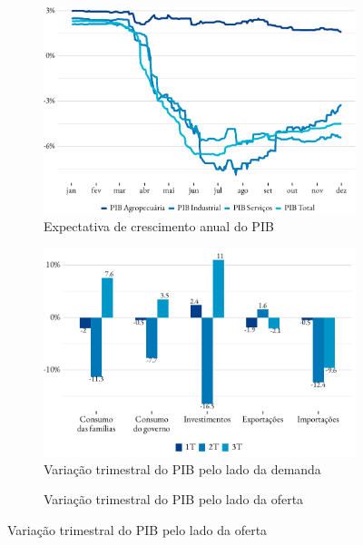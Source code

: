 \begin{figure}[!h]
	\begin{subfigure}{\linewidth}
		\caption{Expectativa de crescimento anual do PIB}
		\label{fig:expec_setor}
		\includegraphics{fig/pib_expec-1.pdf}
	\end{subfigure}
	\begin{subfigure}{\linewidth}
		\caption{Variação trimestral do PIB pelo lado da demanda}
		\label{fig:pib_demanda}
		\includegraphics{fig/pib_demanda.pdf}
	\end{subfigure}
	\begin{subfigure}{\linewidth}
		\caption{Variação trimestral do PIB pelo lado da oferta}
		\label{fig:pib_oferta}

\end{subfigure}
\end{figure}
